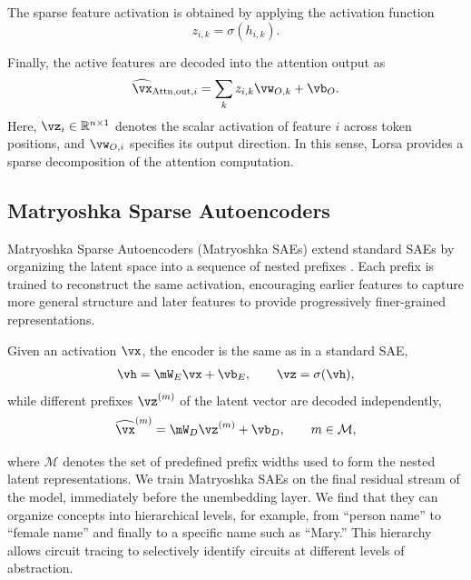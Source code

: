 \documentclass{article}
\begin{document}
The sparse feature activation is obtained by applying the activation function
\begin{equation}
    z_{i,k} = \sigma(h_{i,k}).
\end{equation}

Finally, the active features are decoded into the attention output as
\begin{equation}
    \widehat{\vx}_{\mathrm{Attn,out},i}
    =
    \sum_k z_{i,k}\vw_{O,k}
    + \vb_O.
\end{equation}
Here, $\vz_i \in \mathbb{R}^{n \times 1}$ denotes the scalar activation of feature $i$ across token positions, 
and $\vw_{O,i}$ specifies its output direction. In this sense, Lorsa provides a sparse decomposition of the 
attention computation.

\subsection{Matryoshka Sparse Autoencoders}
\label{sec:matryoshka_sae}

Matryoshka Sparse Autoencoders (Matryoshka SAEs) extend standard SAEs by
organizing the latent space into a sequence of nested prefixes
\citep{bussmann2025matryoshka}. Each prefix is trained to reconstruct the same
activation, encouraging earlier features to capture more general structure and
later features to provide progressively finer-grained representations.

Given an activation $\vx$, the encoder is the same as in a standard SAE,
\begin{equation}
\begin{gathered}
    \vh = \mW_E \vx + \vb_E,
    \qquad
    \vz = \sigma(\vh),
\end{gathered}
\end{equation}
while different prefixes $\vz^{(m)}$ of the latent vector are decoded independently,
\begin{equation}
    \widehat{\vx}^{(m)}
    =
    \mW_D \vz^{(m)} + \vb_D,
    \qquad m \in \mathcal{M},
\end{equation}

where $\mathcal{M}$ denotes the set of predefined prefix widths used to form the nested latent representations.
We train Matryoshka SAEs on the final residual stream of the model, 
immediately before the unembedding layer. We find that they can organize concepts into hierarchical levels, 
for example, from ``person name'' to ``female name'' and finally to a specific name such as ``Mary.'' 
This hierarchy allows circuit tracing to selectively identify circuits at different levels of abstraction.
\end{document}
